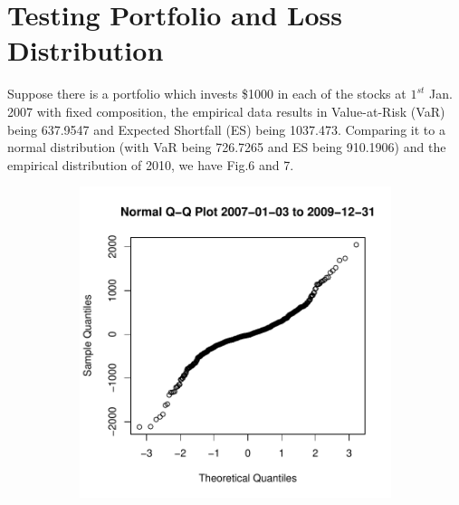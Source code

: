 \documentclass[11pt]{article}
\begin{document}
\section{Testing Portfolio and Loss Distribution}\vspace{-1em}
Suppose there is a portfolio which invests \$1000 in each of the stocks at $1^{st}$ Jan. 2007 with fixed composition, the empirical data results in Value-at-Risk (VaR) being 637.9547 and Expected Shortfall (ES) being 1037.473. Comparing it to a normal distribution (with VaR being 726.7265 and ES being 910.1906) and the empirical distribution of 2010, we have Fig.6 and 7.
\begin{figure}[h]
\begin{subfigure}{0.33\textwidth}
  \centering
  \includegraphics[width=1\linewidth]{graph/NormalQQPlot200709sq.pdf}
\end{subfigure}%
\begin{subfigure}{0.33\textwidth}
  \centering

\end{subfigure}
\end{figure}
\end{document}
